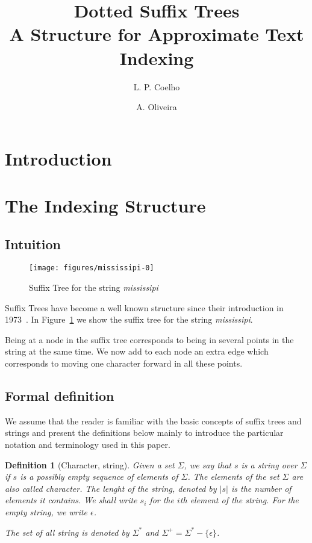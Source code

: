 \documentclass[letter,10pt]{article}
\title{Dotted Suffix Trees\\A Structure for Approximate Text Indexing}
\author{L. P. Coelho \and A. Oliveira}
\newcommand{\putstring}[1]{\textsl{#1}}
\newtheorem{definition}{Definition}
\begin{document}
\maketitle

\begin{abstract}

\end{abstract}

\section{Introduction}


\section{The Indexing Structure}

\subsection{Intuition}

\begin{figure}
\texttt{[image: figures/mississipi-0]}
\caption{Suffix Tree for the string \putstring{mississipi}}%
\label{fig:mississipi-0}
\end{figure}

Suffix Trees have become a well known structure since their introduction in 1973~\cite{weiner}. In Figure~\ref{fig:mississipi-0} we show the suffix tree for the string \putstring{mississipi}.

Being at a node in the suffix tree corresponds to being in several points in the string at the same time. We now add to each node an extra edge which corresponds to moving one character forward in all these points.

\subsection{Formal definition}

We assume that the reader is familiar with the basic concepts of suffix trees and strings and present the definitions below mainly to introduce the particular notation and terminology used in this paper.

\begin{definition}[Character, string]
Given a set $\Sigma$, we say that $s$ is a \emph{string over $\Sigma$} if $s$ is a possibly empty sequence of elements of $\Sigma$. The elements of the set $\Sigma$ are also called \emph{character}. The lenght of the string, denoted by $|s|$ is the number of elements it contains. We shall write $s_i$ for the $i$th element of the string. For the empty string, we write $\epsilon$.

The set of all string is denoted by $\Sigma^*$ and $\Sigma^+=\Sigma^*-\{\epsilon\}$.
\end{definition}
\end{document}
